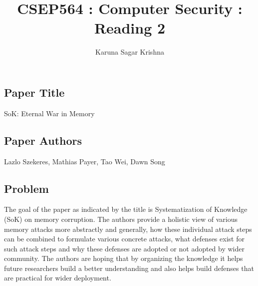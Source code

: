 \documentclass[12pt]{article}
\title{CSEP564 : Computer Security : Reading 2}
\author{Karuna Sagar Krishna}
\begin{document}
    \maketitle

    \subsection*{Paper Title}
    SoK: Eternal War in Memory

    \subsection*{Paper Authors}
    Lazlo Szekeres, Mathias Payer, Tao Wei, Dawn Song

    \subsection*{Problem}
    The goal of the paper as indicated by the title is Systematization of Knowledge (SoK) on memory corruption. The authors provide a holistic view of various memory attacks more abstractly and generally, how these individual attack steps can be combined to formulate various concrete attacks, what defenses exist for such attack steps and why these defenses are adopted or not adopted by wider community. The authors are hoping that by organizing the knowledge it helps future researchers build a better understanding and also helps build defenses that are practical for wider deployment.
\end{document}
